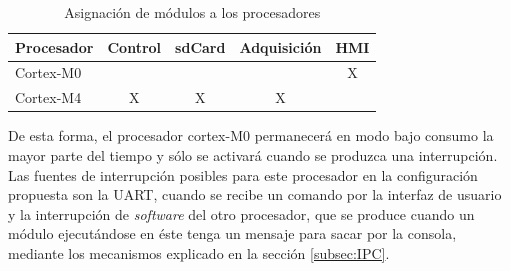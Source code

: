 \begin{table}[ht]
\centering
\caption{Asignación de módulos a los procesadores}
\label{tab:modulos}
\begin{tabular}{lcccc}
\toprule
\textbf{Procesador} & \textbf{Control} & \textbf{sdCard} & \textbf{Adquisición} & \textbf{HMI} \\ \midrule
Cortex-M0			&                  &                 &                      & X            \\ 
Cortex-M4   		& X                & X               & X                    &              \\ 
\bottomrule
\end{tabular}
\end{table}

De esta forma, el procesador cortex-M0 permanecerá en modo bajo consumo la mayor parte del tiempo y sólo se activará cuando se produzca una interrupción.  Las fuentes de interrupción posibles para este procesador en la configuración propuesta son la UART, cuando se recibe un comando por la interfaz de usuario y la interrupción de \textit{software} del otro procesador, que se produce cuando un módulo ejecutándose en éste tenga un mensaje para sacar por la consola, mediante los mecanismos explicado en la sección \ref{subsec:IPC}.

